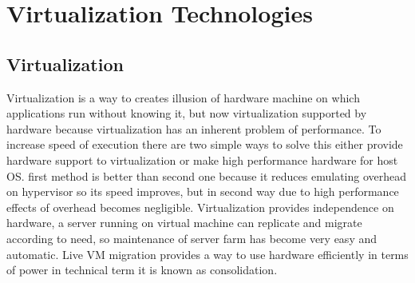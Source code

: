 \documentclass[seminar,twoside]{iitbreport}
\begin{document}
\section{Virtualization Technologies}
\subsection{Virtualization}
Virtualization is a way to creates illusion of hardware machine on which applications run without knowing it, 
but now virtualization supported by hardware 
because virtualization has an inherent problem of performance. To increase speed
of execution there are two simple ways to solve this either provide hardware support to
virtualization or make high performance hardware for host OS. first method is better than
second one because it reduces emulating overhead on hypervisor so its speed improves,
but in second way due to high performance effects of overhead becomes negligible. 
Virtualization provides independence on hardware, a server running on virtual machine can
replicate and migrate according to need, so maintenance of server farm has become very
easy and automatic. Live VM migration provides a way to use hardware efficiently in
terms of power in technical term it is known as consolidation.
\end{document}
